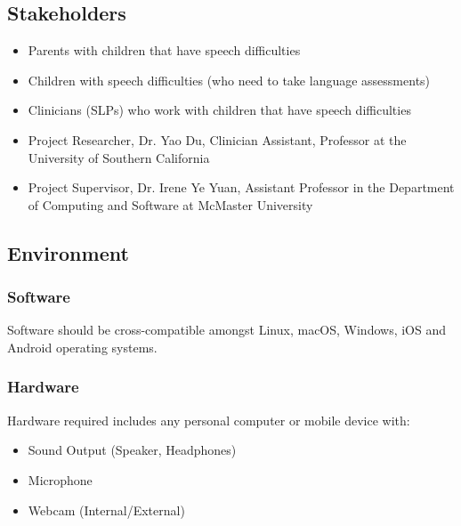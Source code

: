 \documentclass{article}
\begin{document}
\subsection{Stakeholders}
\begin{itemize}
    \item Parents with children that have speech difficulties
    \item Children with speech difficulties (who need to take language assessments)
    \item Clinicians (SLPs) who work with children that have speech difficulties
    \item Project Researcher, Dr. Yao Du, Clinician Assistant, Professor at the University of Southern California
    \item Project Supervisor, Dr. Irene Ye Yuan, Assistant Professor in the Department of Computing and Software at McMaster University
\end{itemize}

\subsection{Environment}
\subsubsection{Software}
Software should be cross-compatible amongst Linux, macOS, Windows, iOS and Android operating systems.
\subsubsection{Hardware}
Hardware required includes any personal computer or mobile device with:
\begin{itemize}
    \item Sound Output (Speaker, Headphones)
    \item Microphone
    \item Webcam (Internal/External)
\end{itemize}
\end{document}

